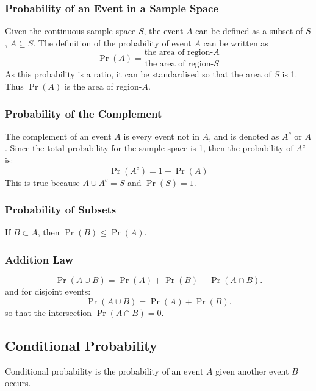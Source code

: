 \documentclass{article}
\begin{document}
\subsubsection{Probability of an Event in a Sample Space}
Given the continuous sample space \(S\), the event \(A\) can be defined as a subset of \(S\), \(A \subseteq S\).
The definition of the probability of event \(A\) can be written as
\begin{equation*}
    \Pr{\left( A \right)} = \frac{\text{the area of region-\(A\)}}{\text{the area of region-\(S\)}}
\end{equation*}
As this probability is a ratio, it can be standardised so that the area of \(S\) is 1.
Thus \(\Pr{\left( A \right)}\) is the area of region-\(A\).
\subsubsection{Probability of the Complement}
The complement of an event \(A\) is every event not in \(A\), and is denoted as
\(A^c\) or \(\overline{A}\). Since the total probability for the sample space is 1, then
the probability of \(A^c\) is:
\begin{equation*}
    \Pr{\left( A^c \right)} = 1 - \Pr{\left( A \right)}
\end{equation*}
This is true because \(A \cup A^c = S\) and \(\Pr{\left( S \right)} = 1\).
\subsubsection{Probability of Subsets}
If \(B \subset A\), then \(\Pr{\left( B \right)} \leq \Pr{\left( A \right)}\).
\subsubsection{Addition Law}
\begin{equation*}
    \Pr{\left( A \cup B \right)} = \Pr{\left( A \right)} + \Pr{\left( B \right)} - \Pr{\left( A \cap B \right)}.
\end{equation*}
and for disjoint events:
\begin{equation*}
    \Pr{\left( A \cup B \right)} = \Pr{\left( A \right)} + \Pr{\left( B \right)}.
\end{equation*}
so that the intersection \(\Pr{\left( A \cap B \right)} = 0\).
\subsection{Conditional Probability}
Conditional probability is the probability of an event \(A\) given another event \(B\) occurs.
\end{document}
